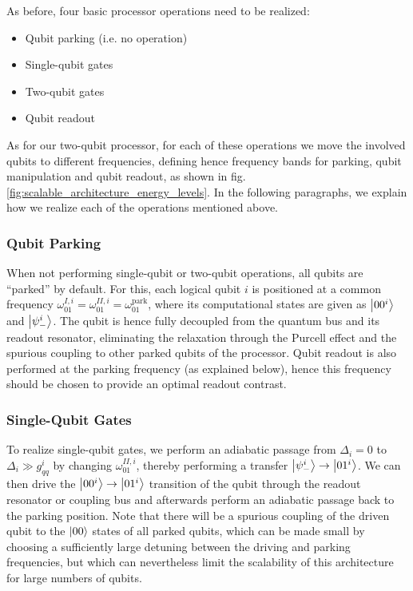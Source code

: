 \smallskip

As before, four basic processor operations need to be realized:

\begin{itemize}
\item Qubit parking (i.e. no operation)
\item Single-qubit gates
\item Two-qubit gates
\item Qubit readout
\end{itemize}

As for our two-qubit processor, for each of these operations we move the involved qubits to different frequencies, defining hence frequency bands for parking, qubit manipulation and qubit readout, as shown in fig. \ref{fig:scalable_architecture_energy_levels}. In the following paragraphs, we explain how we realize each of the operations mentioned above.

\subsubsection{Qubit Parking}

When not performing single-qubit or two-qubit operations, all qubits are ``parked'' by default. For this, each logical qubit $i$ is positioned at a common frequency $\omega_{01}^{I,i}=\omega_{01}^{II,i}=\omega_{01}^{\mathrm{park}}$, where its computational states are given as $\left| 00^i \right>$ and $\left| \psi_-^i \right>$. The qubit is hence fully decoupled from the quantum bus and its readout resonator, eliminating the relaxation through the Purcell effect and the spurious coupling to other parked qubits of the processor. Qubit readout is also performed at the parking frequency (as explained below), hence this frequency should be chosen to provide an optimal readout contrast.

\subsubsection{Single-Qubit Gates}

To realize single-qubit gates, we perform an adiabatic passage from $\Delta_i = 0$ to $\Delta_i \gg g_{qq}^i$ by changing $\omega_{01}^{II,i}$, thereby performing a transfer $\left| \psi_-^i \right>\to\left| 01^i \right>$. We can then drive the $\left| 00^i \right>\to\left| 01^i \right>$ transition of the qubit through the readout resonator or coupling bus and afterwards perform an adiabatic passage back to the parking position. Note that there will be a spurious coupling of the driven qubit to the $\left| 00 \right>$ states of all parked qubits, which can be made small by choosing a sufficiently large detuning between the driving and parking frequencies, but which can nevertheless limit the scalability of this architecture for large numbers of qubits.

